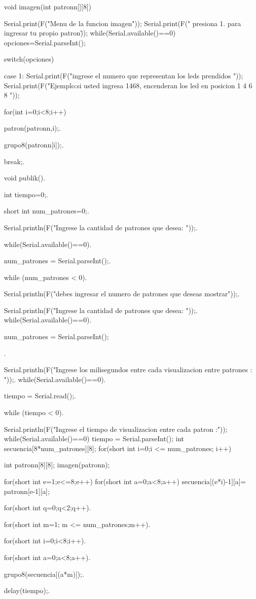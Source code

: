 \documentclass{article}
\begin{document}
void imagen(int patronn[][8])
{	
  Serial.print(F("Menu de la funcion imagen"));
  Serial.print(F(" presiona 1. para ingresar tu propio patron\"));
  while(Serial.available()==0){} 
  opciones=Serial.parseInt();
  
  switch(opciones)
  {
    case 1:
    	Serial.print(F("ingrese el numero que representan los leds prendidos "));
    	Serial.print(F("Ejemplo:si usted ingresa 1468, encenderan los led en posicion 1 4 6 8  "));
    	
    	
    	for(int i=0;i<8;i++)
        
        {
        
          patron(patronn,i);.
          
          grupo8(patronn[i]);.
          
        }
    	
    break;.
    
  }
}
 
void publik().

{
  int tiempo=0;.
  
  short int num_patrones=0;.
  
  Serial.println(F("Ingrese la cantidad de patrones que desea: "));.
  
  while(Serial.available()==0){}.
  
  num_patrones = Serial.parseInt();.
  
  while (num_patrones < 0).
  
  {
    Serial.println(F("debes ingresar el numero de patrones que deseas mostrar"));.
    
    Serial.println(F("Ingrese la cantidad de patrones que desea: "));.
    while(Serial.available()==0){}.
    
    num_patrones = Serial.parseInt();
  } .
  
  
  Serial.println(F("Ingrese los milisegundos entre cada visualizacion entre patrones : "));.
  while(Serial.available()==0){}.
  
  tiempo = Serial.read();.
  
  while (tiempo < 0).
  
  {
  	Serial.println(F("Ingrese el tiempo de visualizacion entre cada patron :"));
    while(Serial.available()==0){}
    tiempo = Serial.parseInt();
  }
  int secuencia[8*num_patrones][8];
  for(short int i=0;i <= num_patrones; i++)
  { int patronn[8][8];
    	imagen(patronn);
   		
   		for(short int e=1;e<=8;e++)
        {	
        	for(short int a=0;a<8;a++)
            {
            	secuencia[(e*i)-1][a]= patronn[e-1][a];
            }
        }
  }
  
  
  for(short int q=0;q<2;q++).
  
  {	for(short int m=1; m <= num_patrones;m++).
  
  	{	for(short int i=0;i<8;i++).
  	
  		{	for(short int a=0;a<8;a++).
  		
        	{	
     			grupo8(secuencia[(a*m)]);.
     			
    	
        	}
  			delay(tiempo);.
  			
    	}
  	}	
  }	
}
\end{document}
